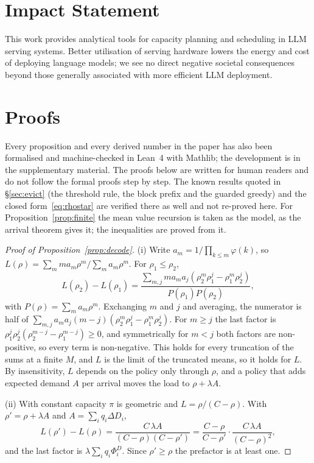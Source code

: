 \documentclass{article}
\theoremstyle{plain}
\theoremstyle{definition}
\theoremstyle{remark}
\begin{document}
\section*{Impact Statement}
This work provides analytical tools for capacity planning and scheduling
in LLM serving systems. Better utilisation of serving hardware lowers the
energy and cost of deploying language models; we see no direct negative
societal consequences beyond those generally associated with more
efficient LLM deployment.




\appendix
\section{Proofs}\label{app:proofs}

\sloppy
Every proposition and every derived number in the paper has also been
formalised and machine-checked in Lean~4 with Mathlib; the development
is in the supplementary material. The proofs below are written for
human readers and do not follow the formal proofs step by step. The
known results quoted in \S\ref{sec:evict} (the threshold rule, the
block prefix and the guarded greedy) and the closed
form~\eqref{eq:rhostar} are verified there as well and not re-proved
here. For Proposition~\ref{prop:finite} the mean value recursion is
taken as the model, as the arrival theorem gives it; the inequalities
are proved from it.


\begin{proof}[Proof of Proposition~\ref{prop:decode}]
(i) Write $a_m=1/\prod_{k\le m}\varphi(k)$, so
$L(\rho)=\sum_mma_m\rho^m/\sum_ma_m\rho^m$. For $\rho_1\le\rho_2$,
\[
  L(\rho_2)-L(\rho_1)=\frac{\sum_{m,j}ma_ma_j(\rho_2^m\rho_1^j-\rho_1^m\rho_2^j)}{P(\rho_1)P(\rho_2)},
\]
with $P(\rho)=\sum_ma_m\rho^m$. Exchanging $m$ and $j$ and averaging, the
numerator is half of
$\sum_{m,j}a_ma_j(m-j)(\rho_2^m\rho_1^j-\rho_1^m\rho_2^j)$. For $m\ge j$
the last factor is $\rho_1^j\rho_2^j(\rho_2^{m-j}-\rho_1^{m-j})\ge0$, and
symmetrically for $m<j$ both factors are non-positive, so every term is
non-negative. This holds for every truncation of the sums at a finite
$M$, and $L$ is the limit of the truncated means, so it holds for $L$.
By insensitivity, $L$ depends on the policy only through $\rho$, and a
policy that adds expected demand $A$ per arrival moves the load to
$\rho+\lambda A$.

(ii) With constant capacity $\pi$ is geometric and $L=\rho/(C-\rho)$.
With $\rho'=\rho+\lambda A$ and $A=\sum_iq_i\Delta D_i$,
\[
  L(\rho')-L(\rho)=\frac{C\,\lambda A}{(C-\rho)(C-\rho')}
  =\frac{C-\rho}{C-\rho'}\cdot\frac{C\,\lambda A}{(C-\rho)^2},
\]
and the last factor is $\lambda\sum_iq_i\Phi^D_i$. Since $\rho'\ge\rho$ the
prefactor is at least one.
\end{proof}
\end{document}
